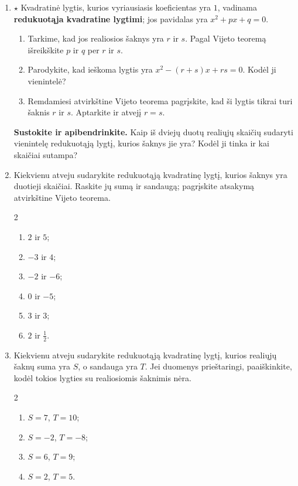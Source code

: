 \documentclass[12pt,a4paper]{article}
\begin{document}
\begin{enumerate}[series=uzdaviniai]
\begin{enumerate}
\item Ar galėtų būti kitas toks daugianaris su vyriausiuoju koeficientu $1$? Paaiškinkite.
\end{enumerate}
\item\label{atlygtis} $\star$ Kvadratinė lygtis, kurios vyriausiasis koeficientas yra $1$, vadinama \textbf{redukuotąja kvadratine lygtimi}; jos pavidalas yra $x^2+px+q=0$.
\begin{enumerate}
\item Tarkime, kad jos realiosios šaknys yra $r$ ir $s$. Pagal Vijeto teoremą išreikškite $p$ ir $q$ per $r$ ir $s$.
\item Parodykite, kad ieškoma lygtis yra $x^2-(r+s)x+rs=0$. Kodėl ji vienintelė?
\item Remdamiesi atvirkštine Vijeto teorema pagrįskite, kad ši lygtis tikrai turi šaknis $r$ ir $s$. Aptarkite ir atvejį $r=s$.
\end{enumerate}
\par\medskip
\textbf{Sustokite ir apibendrinkite.} Kaip iš dviejų duotų realiųjų skaičių sudaryti vienintelę redukuotąją lygtį, kurios šaknys jie yra? Kodėl ji tinka ir kai skaičiai sutampa?
\item Kiekvienu atveju sudarykite redukuotąją kvadratinę lygtį, kurios šaknys yra duotieji skaičiai. Raskite jų sumą ir sandaugą; pagrįskite atsakymą atvirkštine Vijeto teorema.
\begin{multicols}{2}\begin{enumerate}
\item $2$ ir $5$; \item $-3$ ir $4$; \item $-2$ ir $-6$; \item $0$ ir $-5$; \item $3$ ir $3$; \item $2$ ir $\frac{1}{2}$.
\end{enumerate}\end{multicols}
\item Kiekvienu atveju sudarykite redukuotąją kvadratinę lygtį, kurios realiųjų šaknų suma yra $S$, o sandauga yra $T$. Jei duomenys prieštaringi, paaiškinkite, kodėl tokios lygties su realiosiomis šaknimis nėra.
\begin{multicols}{2}\begin{enumerate}
\item $S=7$, $T=10$; \item $S=-2$, $T=-8$; \item $S=6$, $T=9$; \item $S=2$, $T=5$.

\end{enumerate}
\end{multicols}
\end{enumerate}
\end{document}
